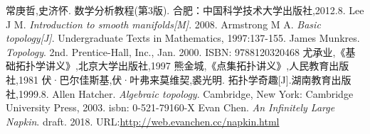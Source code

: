 \documentclass[12pt,A4paper,oneside]{amsart}
\numberwithin{equation}{section}
\theoremstyle{plain}
\theoremstyle{plain}
\theoremstyle{plain}
\numberwithin{equation}{section}
\theoremstyle{remark}
\begin{document}
\begin{thebibliography}{99}


%
常庚哲,史济怀. 数学分析教程(第3版). 合肥：中国科学技术大学出版社,2012.8.
%
Lee J M. \emph{Introduction to smooth manifolds[M]}. 2008.
Armstrong M A. \emph{Basic topology[J]}. Undergraduate Texts in Mathematics, 1997:137-155.
James Munkres. \emph{Topology}. 2nd. Prentice-Hall, Inc., Jan. 2000. ISBN: 9788120320468
%
尤承业,《基础拓扑学讲义》,北京大学出版社,1997
%
熊金城,《点集拓扑讲义》,人民教育出版社,1981
%
伏·巴尔佳斯基,伏·叶弗来莫维契,裘光明. 拓扑学奇趣[J].湖南教育出版社,1999.8.
%
Allen Hatcher. \emph{Algebraic topology}. Cambridge, New York: Cambridge University Press, 2003. isbn: 0-521-79160-X
Evan Chen. \emph{An Infinitely Large Napkin}. draft. 2018.
URL:\href{http://web.evanchen.cc/napkin.html}{http://web.evanchen.cc/napkin.html}




\end{thebibliography}
\end{document}
